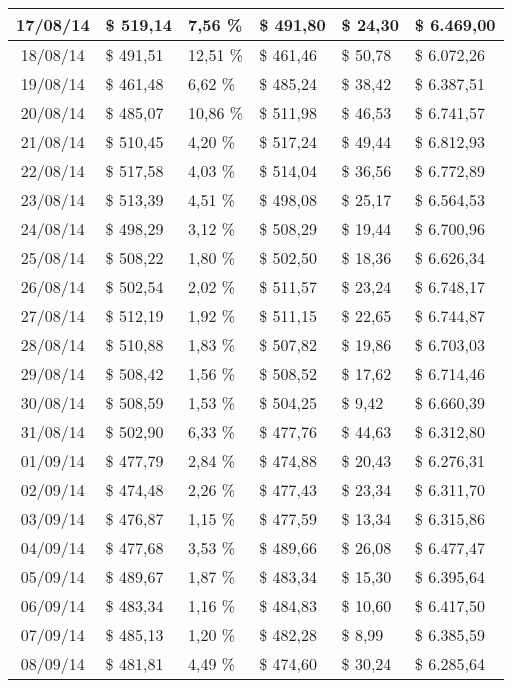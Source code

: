 \begin{small}
\begin{longtable}{|c|l|l|l|l|l|}
17/08/14 & \$ 519,14 & 7,56 \% & \$ 491,80 & \$ 24,30 & \$ 6.469,00 \\ \hline
18/08/14 & \$ 491,51 & 12,51 \% & \$ 461,46 & \$ 50,78 & \$ 6.072,26 \\ \hline
19/08/14 & \$ 461,48 & 6,62 \% & \$ 485,24 & \$ 38,42 & \$ 6.387,51 \\ \hline
20/08/14 & \$ 485,07 & 10,86 \% & \$ 511,98 & \$ 46,53 & \$ 6.741,57 \\ \hline
21/08/14 & \$ 510,45 & 4,20 \% & \$ 517,24 & \$ 49,44 & \$ 6.812,93 \\ \hline
22/08/14 & \$ 517,58 & 4,03 \% & \$ 514,04 & \$ 36,56 & \$ 6.772,89 \\ \hline
23/08/14 & \$ 513,39 & 4,51 \% & \$ 498,08 & \$ 25,17 & \$ 6.564,53 \\ \hline
24/08/14 & \$ 498,29 & 3,12 \% & \$ 508,29 & \$ 19,44 & \$ 6.700,96 \\ \hline
25/08/14 & \$ 508,22 & 1,80 \% & \$ 502,50 & \$ 18,36 & \$ 6.626,34 \\ \hline
26/08/14 & \$ 502,54 & 2,02 \% & \$ 511,57 & \$ 23,24 & \$ 6.748,17 \\ \hline
27/08/14 & \$ 512,19 & 1,92 \% & \$ 511,15 & \$ 22,65 & \$ 6.744,87 \\ \hline
28/08/14 & \$ 510,88 & 1,83 \% & \$ 507,82 & \$ 19,86 & \$ 6.703,03 \\ \hline
29/08/14 & \$ 508,42 & 1,56 \% & \$ 508,52 & \$ 17,62 & \$ 6.714,46 \\ \hline
30/08/14 & \$ 508,59 & 1,53 \% & \$ 504,25 & \$ 9,42 & \$ 6.660,39 \\ \hline
31/08/14 & \$ 502,90 & 6,33 \% & \$ 477,76 & \$ 44,63 & \$ 6.312,80 \\ \hline
01/09/14 & \$ 477,79 & 2,84 \% & \$ 474,88 & \$ 20,43 & \$ 6.276,31 \\ \hline
02/09/14 & \$ 474,48 & 2,26 \% & \$ 477,43 & \$ 23,34 & \$ 6.311,70 \\ \hline
03/09/14 & \$ 476,87 & 1,15 \% & \$ 477,59 & \$ 13,34 & \$ 6.315,86 \\ \hline
04/09/14 & \$ 477,68 & 3,53 \% & \$ 489,66 & \$ 26,08 & \$ 6.477,47 \\ \hline
05/09/14 & \$ 489,67 & 1,87 \% & \$ 483,34 & \$ 15,30 & \$ 6.395,64 \\ \hline
06/09/14 & \$ 483,34 & 1,16 \% & \$ 484,83 & \$ 10,60 & \$ 6.417,50 \\ \hline
07/09/14 & \$ 485,13 & 1,20 \% & \$ 482,28 & \$ 8,99 & \$ 6.385,59 \\ \hline
08/09/14 & \$ 481,81 & 4,49 \% & \$ 474,60 & \$ 30,24 & \$ 6.285,64 \\ \hline

\end{longtable}
\end{small}
